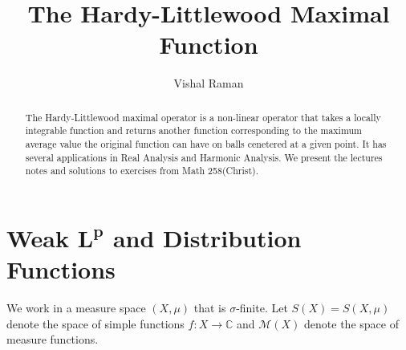 \documentclass[11pt]{scrartcl}
\newcommand{\C}{\mathbb C}
\newcommand{\<}{\langle}
\renewcommand{\>}{\rangle}
\begin{document}
\title{The Hardy-Littlewood Maximal Function}
\author{Vishal Raman}
\maketitle
\begin{abstract}
The Hardy-Littlewood maximal operator is a non-linear operator that takes a locally integrable function and returns another function corresponding to the maximum average value the original function can have on balls cenetered at a given point.  It has several applications in Real Analysis and Harmonic Analysis.  We present the lectures notes and solutions to exercises from Math 258(Christ).
\end{abstract}
\section{Weak $\mathbf{L^p}$ and Distribution Functions}
We work in a measure space $(X, \mu)$ that is $\sigma$-finite.  Let $S(X) = S(X, \mu)$ denote the space of simple functions $f: X \to \C$ and $\mathcal M(X)$ denote the space of measure functions.
\end{document}
